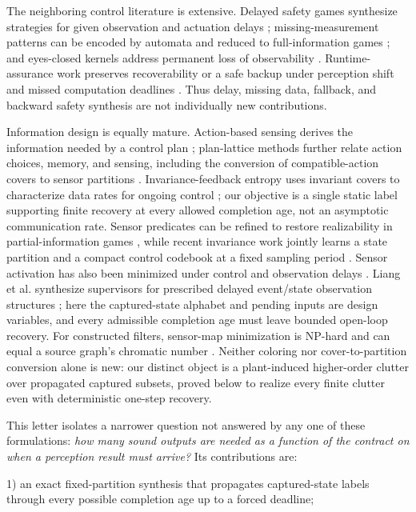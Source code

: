\documentclass[letterpaper,10pt,conference]{ieeeconf}
\begin{document}
The neighboring control literature is extensive. Delayed safety games synthesize strategies for
given observation and actuation delays \cite{chen2021}; missing-measurement patterns can be encoded
by automata and reduced to full-information games \cite{yang2021}; and eyes-closed kernels address
permanent loss of observability \cite{laine2020}. Runtime-assurance work preserves recoverability
or a safe backup under perception shift and missed computation deadlines
\cite{sinha2023,nigam2023}. Thus delay, missing data, fallback, and backward safety
synthesis are not individually new contributions.

Information design is equally mature. Action-based sensing derives the information needed by a
control plan \cite{erdmann1995}; plan-lattice methods further relate action choices, memory, and
sensing, including the conversion of compatible-action covers to sensor partitions
\cite{mcfassel2023}. Invariance-feedback entropy uses invariant covers to characterize
data rates for ongoing control \cite{tomar2021}; our objective is a single static label supporting
finite recovery at every allowed completion age, not an asymptotic communication rate.
Sensor predicates can be refined to restore realizability in
partial-information games \cite{fu2014}, while recent invariance work jointly learns a state
partition and a compact control codebook at a fixed sampling period \cite{yuceel2026}. Sensor
activation has also been minimized under control and observation delays \cite{hou2025}.
Liang et al. synthesize supervisors for prescribed delayed event/state observation structures
\cite{liang2024}; here the captured-state alphabet and pending inputs are design variables, and
every admissible completion age must leave bounded open-loop recovery. For constructed filters,
sensor-map minimization is NP-hard and can equal a source graph's chromatic number
\cite{saberifar2019}. Neither coloring nor cover-to-partition conversion alone is new: our distinct object is a plant-induced
higher-order clutter over propagated captured subsets, proved below to realize every finite
clutter even with deterministic one-step recovery.

This letter isolates a narrower question not answered by any one of these formulations: \emph{how
many sound outputs are needed as a function of the contract on when a perception result must
arrive?} Its contributions are:

1) an exact fixed-partition synthesis that propagates captured-state labels through every possible
completion age up to a forced deadline;
\end{document}
